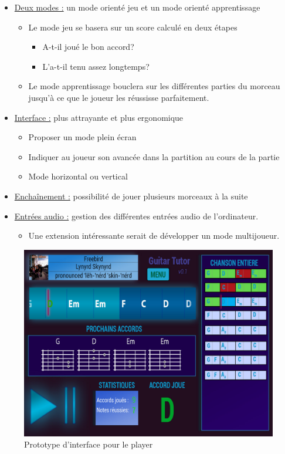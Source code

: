 \begin{itemize}
 \item \underline{Deux modes :} un mode orienté jeu et un mode orienté apprentissage
 \begin{itemize}
  \item Le mode jeu se basera sur un score calculé en deux étapes
  \begin{itemize}
   \item A-t-il joué le bon accord?
   \item L'a-t-il tenu assez longtemps?
  \end{itemize}
  \item Le mode apprentissage bouclera sur les différentes parties du morceau jusqu'à ce que le joueur les réussisse parfaitement.
 \end{itemize}
 \item \underline{Interface :} plus attrayante et plus ergonomique
 \begin{itemize}
  \item Proposer un mode plein écran
  \item Indiquer au joueur son avancée dans la partition au cours de la partie
  \item Mode horizontal ou vertical
 \end{itemize}
 \item \underline{Enchaînement :} possibilité de jouer plusieurs morceaux à la suite
 \item \underline{Entrées audio :} gestion des différentes entrées audio de l'ordinateur.
 \begin{itemize}
  \item Une extension intéressante serait de développer un mode multijoueur.
 \end{itemize}
\end{itemize}


\begin{figure}[!ht]
\begin{center}
\includegraphics[width=450px]{interface_player_prototype.jpg}
\caption{Prototype d'interface pour le player}
\label{annexe_proto_player}
\end{center}
\end{figure}


